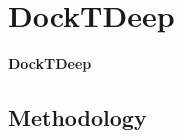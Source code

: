 \documentclass[aspectratio=169,xcolor=dvipsnames]{beamer}
\begin{document}









\section{DockTDeep}
\begin{frame}  %
    \Large{\centerline{\textbf{DockTDeep}}}
\end{frame}



\subsection{Methodology}
\end{document}
